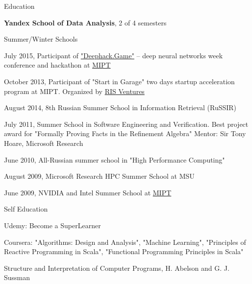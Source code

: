 \documentclass{resume} %
\begin{document}
\begin{rSection}{Education}

\textbf{Yandex School of Data Analysis}, 2 of 4 semesters


\begin{rSubsectionSchools}{Summer/Winter Schools}
\item July 2015, Participant of \href{http://deephack.me/}{"Deephack.Game"} -- deep neural networks week conference and hackathon at \href{http://mipt.ru/}{MIPT}
\item October 2013, Participant of "Start in Garage" two days startup acceleration program at MIPT. Organized by \href{http://www.risventures.com/}{RIS Ventures}
\item August 2014, 8th Russian Summer School in Information Retrieval (RuSSIR)
\item July 2011, Summer School in Software Engineering and Verification. Best project award for "Formally Proving Facts in the Refinement Algebra" Mentor: Sir Tony Hoare, Microsoft Research
\item June 2010, All-Russian summer school in "High Performance Computing"
\item August 2009, Microsoft Research HPC Summer School at MSU
\item June 2009, NVIDIA and Intel Summer School at \href{http://mipt.ru/}{MIPT}
\end{rSubsectionSchools}


\begin{rSubsectionSchools}{Self Education}
\item Udemy: Become a SuperLearner
\item Coursera: "Algorithms: Design and Analysis", "Machine Learning", "Principles of Reactive Programming in Scala", "Functional Programming Principles in Scala"
\item Structure and Interpretation of Computer Programs, H. Abelson and G. J. Sussman 
\end{rSubsectionSchools}

\end{rSection}

\end{document}
